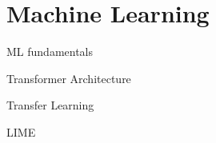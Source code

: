 \section{Machine Learning}
\label{chp:fundamentals:sec:machine_learning}
ML fundamentals

Transformer Architecture

Transfer Learning

LIME
